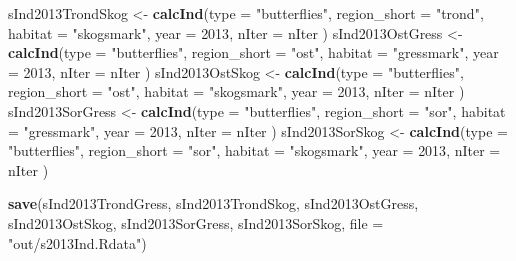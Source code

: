 \documentclass[]{article}
\newenvironment{Shaded}{\begin{snugshade}}{\end{snugshade}}
\newcommand{\KeywordTok}[1]{\textcolor[rgb]{0.13,0.29,0.53}{\textbf{#1}}}
\newcommand{\DataTypeTok}[1]{\textcolor[rgb]{0.13,0.29,0.53}{#1}}
\newcommand{\DecValTok}[1]{\textcolor[rgb]{0.00,0.00,0.81}{#1}}
\newcommand{\StringTok}[1]{\textcolor[rgb]{0.31,0.60,0.02}{#1}}
\newcommand{\NormalTok}[1]{#1}
\begin{document}
\begin{Shaded}
\begin{Highlighting}[]
\NormalTok{sInd2013TrondSkog <-}\StringTok{ }\KeywordTok{calcInd}\NormalTok{(}\DataTypeTok{type =} \StringTok{"butterflies"}\NormalTok{,}
                              \DataTypeTok{region_short =} \StringTok{"trond"}\NormalTok{,}
                              \DataTypeTok{habitat =} \StringTok{"skogsmark"}\NormalTok{,}
                              \DataTypeTok{year =} \DecValTok{2013}\NormalTok{,}
                              \DataTypeTok{nIter =}\NormalTok{ nIter}
\NormalTok{                              )}
\NormalTok{sInd2013OstGress <-}\StringTok{ }\KeywordTok{calcInd}\NormalTok{(}\DataTypeTok{type =} \StringTok{"butterflies"}\NormalTok{,}
                              \DataTypeTok{region_short =} \StringTok{"ost"}\NormalTok{,}
                              \DataTypeTok{habitat =} \StringTok{"gressmark"}\NormalTok{,}
                              \DataTypeTok{year =} \DecValTok{2013}\NormalTok{,}
                              \DataTypeTok{nIter =}\NormalTok{ nIter}
\NormalTok{                              )}
\NormalTok{sInd2013OstSkog <-}\StringTok{ }\KeywordTok{calcInd}\NormalTok{(}\DataTypeTok{type =} \StringTok{"butterflies"}\NormalTok{,}
                              \DataTypeTok{region_short =} \StringTok{"ost"}\NormalTok{,}
                              \DataTypeTok{habitat =} \StringTok{"skogsmark"}\NormalTok{,}
                              \DataTypeTok{year =} \DecValTok{2013}\NormalTok{,}
                              \DataTypeTok{nIter =}\NormalTok{ nIter}
\NormalTok{                              )}
\NormalTok{sInd2013SorGress <-}\StringTok{ }\KeywordTok{calcInd}\NormalTok{(}\DataTypeTok{type =} \StringTok{"butterflies"}\NormalTok{,}
                              \DataTypeTok{region_short =} \StringTok{"sor"}\NormalTok{,}
                              \DataTypeTok{habitat =} \StringTok{"gressmark"}\NormalTok{,}
                              \DataTypeTok{year =} \DecValTok{2013}\NormalTok{,}
                              \DataTypeTok{nIter =}\NormalTok{ nIter}
\NormalTok{                              )}
\NormalTok{sInd2013SorSkog <-}\StringTok{ }\KeywordTok{calcInd}\NormalTok{(}\DataTypeTok{type =} \StringTok{"butterflies"}\NormalTok{,}
                              \DataTypeTok{region_short =} \StringTok{"sor"}\NormalTok{,}
                              \DataTypeTok{habitat =} \StringTok{"skogsmark"}\NormalTok{,}
                              \DataTypeTok{year =} \DecValTok{2013}\NormalTok{,}
                              \DataTypeTok{nIter =}\NormalTok{ nIter}
\NormalTok{                              )}

\KeywordTok{save}\NormalTok{(sInd2013TrondGress, sInd2013TrondSkog, sInd2013OstGress, sInd2013OstSkog, sInd2013SorGress, sInd2013SorSkog, }\DataTypeTok{file =} \StringTok{"out/s2013Ind.Rdata"}\NormalTok{)}
\end{Highlighting}
\end{Shaded}
\end{document}
